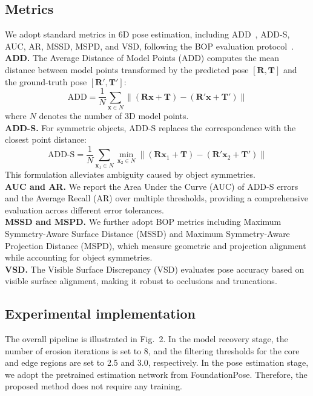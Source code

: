 \documentclass[letterpaper, 10 pt, journal, twoside]{IEEEtran}  %
\begin{document}
\subsection{Metrics}
We adopt standard metrics in 6D pose estimation, including ADD~\cite{xiang2017posecnn,wang2019densefusion}, ADD-S, AUC, AR, MSSD, MSPD, and VSD, following the BOP evaluation protocol~\cite{hodan2024bop}.
\\ \textbf{ADD.} The Average Distance of Model Points (ADD) computes the mean distance between model points transformed by the predicted pose $[\mathbf{R}, \mathbf{T}]$ and the ground-truth pose $[\mathbf{R'}, \mathbf{T'}]$:
	\begin{equation}
		\text{ADD} = \frac{1}{N} \sum_{\mathbf{x} \in N} \left\| (\mathbf{R}\mathbf{x} + \mathbf{T}) - (\mathbf{R'}\mathbf{x} + \mathbf{T'}) \right\|
	\end{equation}
	where $N$ denotes the number of 3D model points.
\\ \textbf{ADD-S.}     For symmetric objects, ADD-S replaces the correspondence with the closest point distance:
	\begin{equation}
		\text{ADD-S} = \frac{1}{N} \sum_{\mathbf{x}_1 \in N} \min_{\mathbf{x}_2 \in N} \left\| (\mathbf{R}\mathbf{x}_1 + \mathbf{T}) - (\mathbf{R'}\mathbf{x}_2 + \mathbf{T'}) \right\|
	\end{equation}
This formulation alleviates ambiguity caused by object symmetries.
\\ \textbf{AUC and AR.}    We report the Area Under the Curve (AUC) of ADD-S errors and the Average Recall (AR) over multiple thresholds, providing a comprehensive evaluation across different error tolerances.
\\ \textbf{MSSD and MSPD.}    We further adopt BOP metrics including Maximum Symmetry-Aware Surface Distance (MSSD) and Maximum Symmetry-Aware Projection Distance (MSPD), which measure geometric and projection alignment while accounting for object symmetries.
\\ \textbf{VSD.}    The Visible Surface Discrepancy (VSD) evaluates pose accuracy based on visible surface alignment, making it robust to occlusions and truncations.

\subsection{Experimental implementation}
The overall pipeline is illustrated in Fig.~2. 
In the model recovery stage, the number of erosion iterations is set to 8, and the filtering thresholds for the core and edge regions are set to 2.5 and 3.0, respectively. 
In the pose estimation stage, we adopt the pretrained estimation network from FoundationPose. 
Therefore, the proposed method does not require any training.
\end{document}
